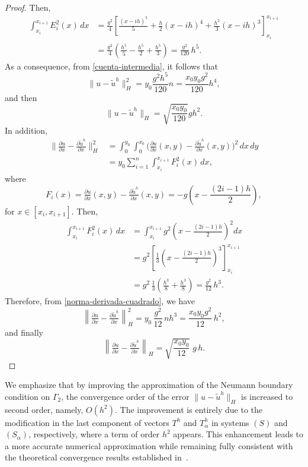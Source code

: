 \documentclass[axioms,article,submit,moreauthors]{Definitions/mdpi}
\newcommand{\dee}{d}
\newcommand\pder[2][]{\ensuremath{\tfrac{\partial#1}{\partial#2}}}
\begin{document}
\begin{proof}
Then,
\begin{equation}\label{integralEi}
\begin{aligned}
\int_{x_i}^{x_{i+1}} E_i^2(x)\,\dee x
&= \frac{g^2}{4}
\left[
\frac{(x-i h)^5}{5}
+ \frac{h}{2}(x-i h)^4
+ \frac{h^2}{3}(x-i h)^3
\right]_{x_i}^{x_{i+1}} \\[0.8ex]
&= \frac{g^2}{4}
\left(
\frac{h^5}{5}
- \frac{h^5}{2}
+ \frac{h^5}{3}
\right)
= \frac{g^2}{120}\,h^5 .
\end{aligned}
\end{equation}
As a consequence, from \eqref{cuenta-intermedia}, it follows that
\[\|u-{\widetilde{u}^h}\|_{H}^2=y_0 \frac{g^2 h^5}{120} n= \frac{x_0 y_0 g^2}{120} h^4,\]
and then
\[\|u-{\widetilde{u}^h}\|_{H}=\sqrt{\frac{x_0 y_0 }{120}} g h^2. \]
In addition,
\begin{equation}\label{norma-derivada-cuadrado}
\begin{aligned}
\big\|\pder[u]{x}-\pder[{\widetilde{u}^h}]{x}\big\|_{H}^{2}
&= \int_0^{y_0}\int_0^{x_0}
\big(\pder[u]{x}(x,y)-\pder[{\widetilde{u}^h}]{x}(x,y)\big)^2
\,\dee x\,\dee y \\[1ex]
&= y_0 \sum_{i=1}^n \int_{x_i}^{x_{i+1}} F_i^2(x)\,\dee x ,
\end{aligned}
\end{equation}
where
\[
F_i(x)
= \pder[u]{x}(x,y)-\pder[{\widetilde{u}^h}]{x}(x,y)
= -g\!\left(x-\frac{(2i-1)h}{2}\right),
\]
 for $x\in[x_i,x_{i+1}]$.
 Then,
 \[
\begin{aligned}
\int_{x_i}^{x_{i+1}} F_i^2(x)\,\dee x
&= \int_{x_i}^{x_{i+1}}
g^2\!\left(x-\frac{(2i-1)h}{2}\right)^2 \dee x \\[0.8ex]
&= g^2
\left[
\frac{1}{3}\left(x-\frac{(2i-1)h}{2}\right)^3
\right]_{x_i}^{x_{i+1}} \\
&= g^2\,
\frac{1}{3}\left(\frac{h^3}{8}+\frac{h^3}{8}\right)
= \frac{g^2}{12}\,h^3 .
\end{aligned}
\]
Therefore, from \eqref{norma-derivada-cuadrado}, we have
\[
\left\|\pder[u]{x}-\pder[{\widetilde{u}^h}]{x}\right\|_{H}^{2}
= y_0\,\frac{g^2}{12}\,n h^3
= \frac{x_0 y_0 g^2}{12}\,h^2 ,
\]
and finally
\[
\left\|\pder[u]{x}-\pder[{\widetilde{u}^h}]{x}\right\|_{H}
= \sqrt{\frac{x_0 y_0}{12}}\; g\, h .
\]
\end{proof}

 
 \begin{Remark}
We emphasize that by improving the approximation of the Neumann boundary condition on $\Gamma_2$, the convergence order of the error $\|u-{\widetilde{u}^h}\|_H$ is increased to second order, namely, $O(h^2)$. {The improvement is entirely due to the modification in the last component of vectors $T^h$ and $T^h_\alpha$  in systems $(S)$ and $(S_\alpha)$, respectively, where a term of order $h^2$ appears.}
This enhancement leads to a more accurate numerical approximation while remaining fully consistent with the theoretical convergence results established in~\cite{CaMa2002,Hi2005}.
\end{Remark}
\end{document}

